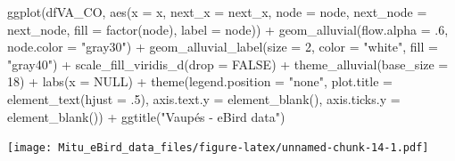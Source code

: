 \documentclass[
]{article}
\newenvironment{Shaded}{\begin{snugshade}}{\end{snugshade}}
\newcommand{\AttributeTok}[1]{\textcolor[rgb]{0.77,0.63,0.00}{#1}}
\newcommand{\ConstantTok}[1]{\textcolor[rgb]{0.00,0.00,0.00}{#1}}
\newcommand{\DecValTok}[1]{\textcolor[rgb]{0.00,0.00,0.81}{#1}}
\newcommand{\FunctionTok}[1]{\textcolor[rgb]{0.00,0.00,0.00}{#1}}
\newcommand{\NormalTok}[1]{#1}
\newcommand{\SpecialCharTok}[1]{\textcolor[rgb]{0.00,0.00,0.00}{#1}}
\newcommand{\StringTok}[1]{\textcolor[rgb]{0.31,0.60,0.02}{#1}}
\begin{document}
\begin{Shaded}
\begin{Highlighting}[]
\FunctionTok{ggplot}\NormalTok{(dfVA\_CO, }\FunctionTok{aes}\NormalTok{(}\AttributeTok{x =}\NormalTok{ x, }\AttributeTok{next\_x =}\NormalTok{ next\_x, }\AttributeTok{node =}\NormalTok{ node, }\AttributeTok{next\_node =}\NormalTok{ next\_node, }\AttributeTok{fill =} \FunctionTok{factor}\NormalTok{(node), }\AttributeTok{label =}\NormalTok{ node)) }\SpecialCharTok{+}
  \FunctionTok{geom\_alluvial}\NormalTok{(}\AttributeTok{flow.alpha =}\NormalTok{ .}\DecValTok{6}\NormalTok{,}
              \AttributeTok{node.color =} \StringTok{"gray30"}\NormalTok{) }\SpecialCharTok{+}
  \FunctionTok{geom\_alluvial\_label}\NormalTok{(}\AttributeTok{size =} \DecValTok{2}\NormalTok{, }\AttributeTok{color =} \StringTok{"white"}\NormalTok{, }\AttributeTok{fill =} \StringTok{"gray40"}\NormalTok{) }\SpecialCharTok{+}
  \FunctionTok{scale\_fill\_viridis\_d}\NormalTok{(}\AttributeTok{drop =} \ConstantTok{FALSE}\NormalTok{) }\SpecialCharTok{+}
  \FunctionTok{theme\_alluvial}\NormalTok{(}\AttributeTok{base\_size =} \DecValTok{18}\NormalTok{) }\SpecialCharTok{+}
  \FunctionTok{labs}\NormalTok{(}\AttributeTok{x =} \ConstantTok{NULL}\NormalTok{) }\SpecialCharTok{+}
  \FunctionTok{theme}\NormalTok{(}\AttributeTok{legend.position =} \StringTok{"none"}\NormalTok{,}
        \AttributeTok{plot.title =} \FunctionTok{element\_text}\NormalTok{(}\AttributeTok{hjust =}\NormalTok{ .}\DecValTok{5}\NormalTok{),}
        \AttributeTok{axis.text.y =} \FunctionTok{element\_blank}\NormalTok{(),}
        \AttributeTok{axis.ticks.y =} \FunctionTok{element\_blank}\NormalTok{()) }\SpecialCharTok{+}
  \FunctionTok{ggtitle}\NormalTok{(}\StringTok{"Vaupés {-} eBird data"}\NormalTok{)}
\end{Highlighting}
\end{Shaded}

\texttt{[image: Mitu\_eBird\_data\_files/figure-latex/unnamed-chunk-14-1.pdf]}
\end{document}
